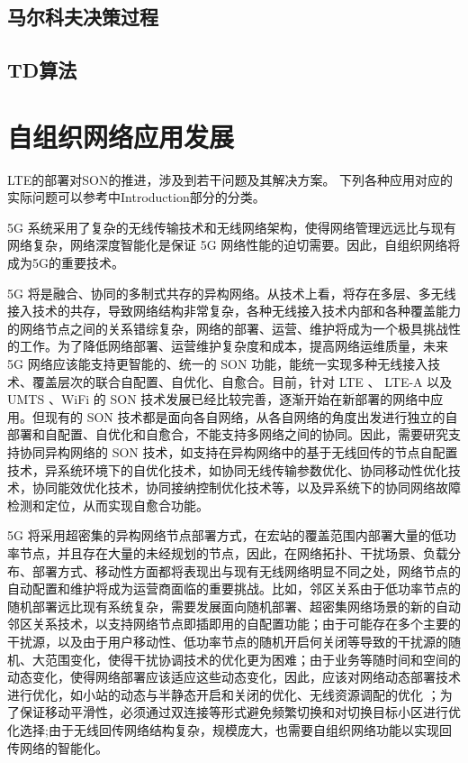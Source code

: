 \documentclass{IEEEtran}
\begin{document}

\subsection{马尔科夫决策过程}

\subsection{TD算法}



\section{自组织网络应用发展}
\label{sec:SON}
LTE的部署对SON的推进，涉及到若干问题及其解决方案。
下列各种应用对应的实际问题可以参考\cite{Klaine2017}中Introduction部分的分类。

5G 系统采用了复杂的无线传输技术和无线网络架构，使得网络管理远远比与现有网络复杂，网络深度智能化是保证 5G 网络性能的迫切需要。因此，自组织网络将成为5G的重要技术。

5G 将是融合、协同的多制式共存的异构网络。从技术上看，将存在多层、多无线接入技术的共存，导致网络结构非常复杂，各种无线接入技术内部和各种覆盖能力的网络节点之间的关系错综复杂，网络的部署、运营、维护将成为一个极具挑战性的工作。为了降低网络部署、运营维护复杂度和成本，提高网络运维质量，未来 5G 网络应该能支持更智能的、统一的 SON 功能，能统一实现多种无线接入技术、覆盖层次的联合自配置、自优化、自愈合。目前，针对 LTE 、 LTE-A 以及 UMTS 、WiFi 的 SON 技术发展已经比较完善，逐渐开始在新部署的网络中应用。但现有的 SON 技术都是面向各自网络，从各自网络的角度出发进行独立的自部署和自配置、自优化和自愈合，不能支持多网络之间的协同。因此，需要研究支持协同异构网络的 SON 技术，如支持在异构网络中的基于无线回传的节点自配置技术，异系统环境下的自优化技术，如协同无线传输参数优化、协同移动性优化技术，协同能效优化技术，协同接纳控制优化技术等，以及异系统下的协同网络故障检测和定位，从而实现自愈合功能。

5G 将采用超密集的异构网络节点部署方式，在宏站的覆盖范围内部署大量的低功率节点，并且存在大量的未经规划的节点，因此，在网络拓扑、干扰场景、负载分布、部署方式、移动性方面都将表现出与现有无线网络明显不同之处，网络节点的自动配置和维护将成为运营商面临的重要挑战。比如，邻区关系由于低功率节点的随机部署远比现有系统复杂，需要发展面向随机部署、超密集网络场景的新的自动邻区关系技术，以支持网络节点即插即用的自配置功能；由于可能存在多个主要的干扰源，以及由于用户移动性、低功率节点的随机开启何关闭等导致的干扰源的随机、大范围变化，使得干扰协调技术的优化更为困难；由于业务等随时间和空间的动态变化，使得网络部署应该适应这些动态变化，因此，应该对网络动态部署技术进行优化，如小站的动态与半静态开启和关闭的优化、无线资源调配的优化 ；为了保证移动平滑性，必须通过双连接等形式避免频繁切换和对切换目标小区进行优化选择;由于无线回传网络结构复杂，规模庞大，也需要自组织网络功能以实现回传网络的智能化。
\end{document}
